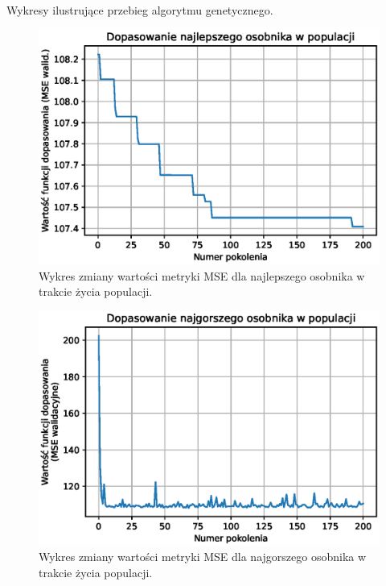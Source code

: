 \documentclass[a4paper,11pt]{article}
\begin{document}
    Wykresy ilustrujące przebieg algorytmu genetycznego.

    \begin{figure}[H]
        \label{fig:g_a_best_fitness}
        \centering
        \includegraphics[width=\textwidth]{g_a_best_fitness}
        \caption{Wykres zmiany wartości metryki MSE dla najlepszego osobnika w trakcie życia populacji.}
    \end{figure}

    \bigskip

    \begin{figure}[H]
        \label{fig:g_a_worst_fitness}
        \centering
        \includegraphics[width=\textwidth]{g_a_worst_fitness}
        \caption{Wykres zmiany wartości metryki MSE dla najgorszego osobnika w trakcie życia populacji.}
    \end{figure}
\end{document}
